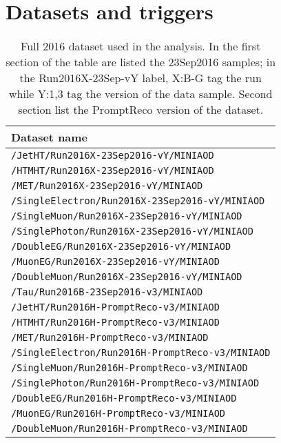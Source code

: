 \chapter{Datasets and triggers}

\begin{table}[ht!]
  \centering 
  \begin{tabular}{l}\hline
    Dataset name  \\ \hline
    \verb|/JetHT/Run2016X-23Sep2016-vY/MINIAOD|\\          
    \verb|/HTMHT/Run2016X-23Sep2016-vY/MINIAOD|\\         
    \verb|/MET/Run2016X-23Sep2016-vY/MINIAOD|\\            
    \verb|/SingleElectron/Run2016X-23Sep2016-vY/MINIAOD|\\ 
    \verb|/SingleMuon/Run2016X-23Sep2016-vY/MINIAOD|\\   
    \verb|/SinglePhoton/Run2016X-23Sep2016-vY/MINIAOD|\\   
    \verb|/DoubleEG/Run2016X-23Sep2016-vY/MINIAOD|\\     
    \verb|/MuonEG/Run2016X-23Sep2016-vY/MINIAOD|\\     
    \verb|/DoubleMuon/Run2016X-23Sep2016-vY/MINIAOD|\\
    \verb|/Tau/Run2016B-23Sep2016-v3/MINIAOD|\\\hline
    \verb|/JetHT/Run2016H-PromptReco-v3/MINIAOD|\\        
    \verb|/HTMHT/Run2016H-PromptReco-v3/MINIAOD|\\        
    \verb|/MET/Run2016H-PromptReco-v3/MINIAOD|\\          
    \verb|/SingleElectron/Run2016H-PromptReco-v3/MINIAOD|\\
    \verb|/SingleMuon/Run2016H-PromptReco-v3/MINIAOD|\\   
    \verb|/SinglePhoton/Run2016H-PromptReco-v3/MINIAOD|\\ 
    \verb|/DoubleEG/Run2016H-PromptReco-v3/MINIAOD|\\     
    \verb|/MuonEG/Run2016H-PromptReco-v3/MINIAOD|\\       
    \verb|/DoubleMuon/Run2016H-PromptReco-v3/MINIAOD|\\\hline 
  \end{tabular}
  \caption[Full 2016 dataset.]{Full 2016 dataset used in the analysis. In the first section of the table are listed the 23Sep2016 samples; in the Run2016X-23Sep-vY label, X:B-G tag the run while Y:1,3 tag the version of the data sample. Second section list the PromptReco version of the dataset.}\label{tab:dataset}
\end{table}

